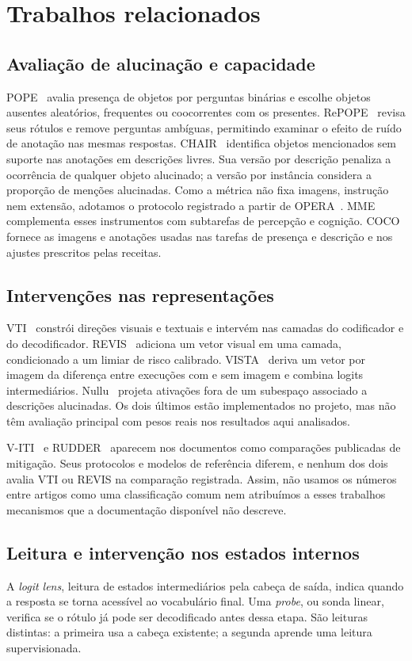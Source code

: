 \section{Trabalhos relacionados}
\subsection{Avaliação de alucinação e capacidade}
POPE~\cite{pope} avalia presença de objetos por perguntas binárias e escolhe objetos ausentes aleatórios, frequentes ou coocorrentes com os presentes. RePOPE~\cite{repope} revisa seus rótulos e remove perguntas ambíguas, permitindo examinar o efeito de ruído de anotação nas mesmas respostas. CHAIR~\cite{chair} identifica objetos mencionados sem suporte nas anotações em descrições livres. Sua versão por descrição penaliza a ocorrência de qualquer objeto alucinado; a versão por instância considera a proporção de menções alucinadas. Como a métrica não fixa imagens, instrução nem extensão, adotamos o protocolo registrado a partir de OPERA~\cite{opera}. MME~\cite{mme} complementa esses instrumentos com subtarefas de percepção e cognição. COCO~\cite{coco} fornece as imagens e anotações usadas nas tarefas de presença e descrição e nos ajustes prescritos pelas receitas.

\subsection{Intervenções nas representações}
VTI~\cite{vti} constrói direções visuais e textuais e intervém nas camadas do codificador e do decodificador. REVIS~\cite{revis} adiciona um vetor visual em uma camada, condicionado a um limiar de risco calibrado. VISTA~\cite{vista} deriva um vetor por imagem da diferença entre execuções com e sem imagem e combina logits intermediários. Nullu~\cite{nullu} projeta ativações fora de um subespaço associado a descrições alucinadas. Os dois últimos estão implementados no projeto, mas não têm avaliação principal com pesos reais nos resultados aqui analisados.

V-ITI~\cite{viti} e RUDDER~\cite{rudder} aparecem nos documentos como comparações publicadas de mitigação. Seus protocolos e modelos de referência diferem, e nenhum dos dois avalia VTI ou REVIS na comparação registrada. Assim, não usamos os números entre artigos como uma classificação comum nem atribuímos a esses trabalhos mecanismos que a documentação disponível não descreve.

\subsection{Leitura e intervenção nos estados internos}
A \textit{logit lens}, leitura de estados intermediários pela cabeça de saída, indica quando a resposta se torna acessível ao vocabulário final. Uma \textit{probe}, ou sonda linear, verifica se o rótulo já pode ser decodificado antes dessa etapa. São leituras distintas: a primeira usa a cabeça existente; a segunda aprende uma leitura supervisionada.

